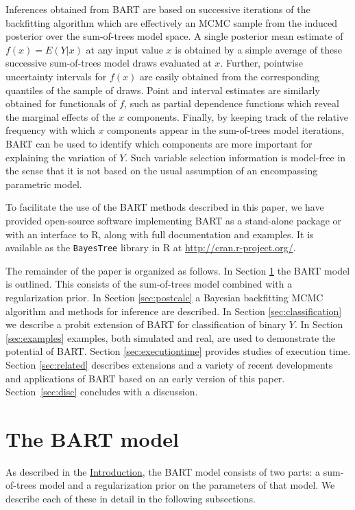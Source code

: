 \documentclass[aoas,nameyear,dvips]{arximspdf}
\begin{document}
Inferences obtained from BART are based on successive iterations of the backfitting algorithm
which are effectively an MCMC sample from the induced posterior over the sum-of-trees model space.
A single posterior mean estimate of $f(x) = E(Y | x)$ at
any input value $x$ is obtained by a simple average of these successive
sum-of-trees model draws evaluated at $x$.  Further, pointwise uncertainty intervals for $f(x)$ are
easily obtained from the corresponding quantiles of the sample of draws.
Point and interval estimates are similarly obtained for functionals of $f$, such as partial dependence functions which reveal the marginal effects
of the $x$ components.
Finally, by keeping track of the relative frequency with
which $x$ components appear in the sum-of-trees model iterations, BART can be used to identify
which components are more important for explaining
the variation of $Y$.  Such variable selection information is model-free in the sense that it is not based on the usual assumption of an encompassing parametric model.

To facilitate the use of the BART methods described in this paper,
we have provided open-source software implementing BART as a stand-alone package or with an
interface to R, along with full documentation and examples.  It is
available as the \texttt{BayesTree} library in R at \url{http://cran.r-project.org/}.

The remainder of the paper is organized as follows.  In Section
\ref{sec:model} the BART model is outlined.  This consists of the
sum-of-trees model combined with a regularization prior. In
Section \ref{sec:postcalc} a Bayesian backfitting MCMC algorithm
and methods for inference are described. In Section \ref{sec:classification}
we describe a probit extension of BART for classification of binary $Y$.
In Section \ref{sec:examples} examples, both simulated and real, are used to
demonstrate the potential of BART. Section \ref{sec:executiontime} provides studies of execution time.
Section \ref{sec:related} describes extensions and
a variety of recent developments and applications of BART based on an early version of
this paper.  Section~\ref{sec:disc} concludes with a discussion.

\section{The BART model}\label{sec:model}

As described in the \hyperref[sec:intro]{Introduction}, the BART model consists of two parts: a sum-of-trees model
and a regularization prior on the parameters of that model.  We describe each of these in detail in the following subsections.
\end{document}
